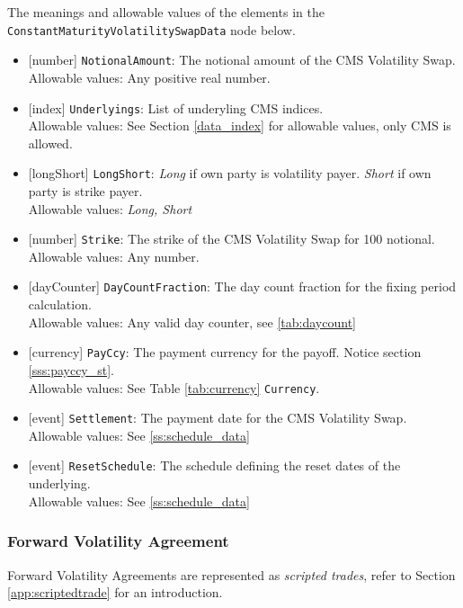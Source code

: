 The meanings and allowable values of the elements in the \lstinline!ConstantMaturityVolatilitySwapData! node below.

\begin{itemize}
  \item{}[number] \lstinline!NotionalAmount!: The notional amount of the CMS Volatility Swap. \\
    Allowable values: Any positive real number.
  \item{}[index] \lstinline!Underlyings!: List of underyling CMS indices. \\
    Allowable values: See Section \ref{data_index} for allowable values, only CMS is allowed.
  \item{}[longShort] \lstinline!LongShort!: \emph{Long} if own party is volatility payer. \emph{Short} if own party is strike payer.\\
    Allowable values: \emph{Long, Short}
  \item{}[number] \lstinline!Strike!: The strike of the CMS Volatility Swap for 100 notional.\\
    Allowable values: Any number.
  \item{}[dayCounter] \lstinline!DayCountFraction!: The day count fraction for the fixing period calculation.\\
    Allowable values: Any valid day counter, see \ref{tab:daycount}
  \item{}[currency] \lstinline!PayCcy!: The payment currency for the payoff.  Notice section \ref{sss:payccy_st}.\\
    Allowable values: See Table \ref{tab:currency} \lstinline!Currency!.
  \item{}[event] \lstinline!Settlement!: The payment date for the CMS Volatility Swap.\\
    Allowable values: See \ref{ss:schedule_data}
  \item{}[event] \lstinline!ResetSchedule!: The schedule defining the reset dates of the underlying.\\
    Allowable values: See \ref{ss:schedule_data}
\end{itemize}

\subsubsection{Forward Volatility Agreement} 
 
 
Forward Volatility Agreements are represented as {\em scripted trades}, refer to Section 
\ref{app:scriptedtrade} for an introduction.
 
